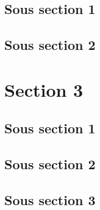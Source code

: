 \subsection{Sous section 1}
\subsection{Sous section 2}

\section{Section 3}

\subsection{Sous section 1}
\subsection{Sous section 2}
\subsection{Sous section 3}
